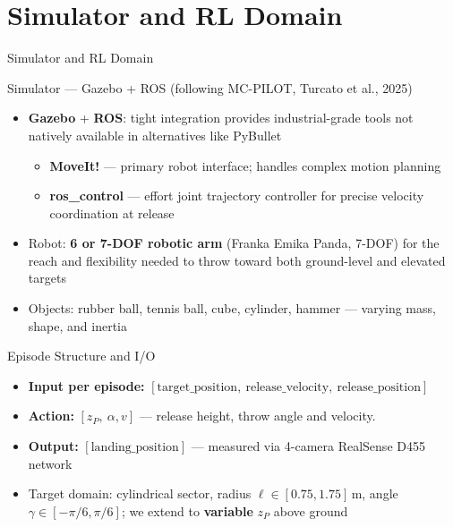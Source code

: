 \documentclass{if-beamer}
\begin{document}
\section{Simulator and RL Domain}

\begin{frame}{Simulator and RL Domain}
    \begin{block}{Simulator --- Gazebo + ROS \textnormal{\small{(following MC-PILOT, Turcato et al., 2025)}}}
        \begin{itemize}
            \item \textbf{Gazebo} + \textbf{ROS}: tight integration provides industrial-grade tools not natively available in alternatives like PyBullet
            \begin{itemize}
                \item \textbf{MoveIt!} --- primary robot interface; handles complex motion planning
                \item \textbf{ros\_control} --- effort joint trajectory controller for precise velocity coordination at release
            \end{itemize}
            \item Robot: \textbf{6 or 7-DOF robotic arm} (Franka Emika Panda, 7-DOF) for the reach and flexibility needed to throw toward both ground-level and elevated targets
            \item Objects: rubber ball, tennis ball, cube, cylinder, hammer --- varying mass, shape, and inertia
        \end{itemize}
    \end{block}
    \begin{block}{Episode Structure and I/O}
        \begin{itemize}
            \item \textbf{Input per episode:} $[\text{target\_position},\ \text{release\_velocity},\ \text{release\_position}]$
            \item \textbf{Action:} $[z_P,\ \alpha,v]$ --- release height, throw angle and velocity.
            \item \textbf{Output:} $[\text{landing\_position}]$ --- measured via 4-camera RealSense D455 network
            \item Target domain: cylindrical sector, radius $\ell \in [0.75, 1.75]$\,m, angle $\gamma \in [-\pi/6, \pi/6]$; we extend to \textbf{variable} $z_P$ above ground
        \end{itemize}
    \end{block}
\end{frame}
\end{document}
